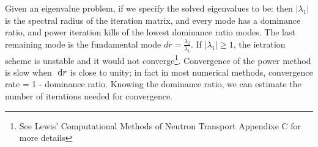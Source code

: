 \documentclass{school-22.211-notes}
\begin{document}
\clearpage
{}
Given an eigenvalue problem, if we specify the solved eigenvalues to be:
then $|\lambda_1|$ is the spectral radius of the iteration matrix, and every mode has a dominance ratio,
and power iteration kills of the lowest dominance ratio modes. The last remaining mode is the fundamental mode $dr = \frac{\lambda_2}{\lambda_1}$. If $|\lambda_1| \ge 1$, the ietration scheme is unstable and it would not converge\footnote{See Lewis' Computational Methods of Neutron Transport Appendixe C for more details}. Convergence of the power method is slow when $\mbox{ }\mathrm{d} r$ is close to unity; in fact in most numerical methods, convergence rate = 1 - dominance ratio. Knowing the dominance ratio, we can estimate the number of iterations needed for convergence. 
\end{document}
